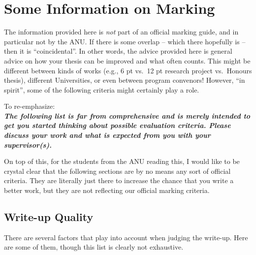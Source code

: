 \chapter{Some Information on Marking}\label{chap:Marking}

The information provided here is \emph{not} part of an official marking guide, and in particular not by the ANU. If there is some overlap -- which there hopefully is -- then it is ``coincidental''. In other words, the advice provided here is general advice on how your thesis can be improved and what often counts. This might be different between kinds of works (e.g., 6 pt vs.\ 12 pt research project vs.\ Honours thesis), different Universities, or even between program convenors! However, ``in spirit'', some of the following criteria might certainly play a role.

To re-emphasize:\\[.5em]
\emph{\textbf{The following list is far from comprehensive and is merely intended to get you started thinking about possible evaluation criteria. Please discuss your work and what is expected from you with your supervisor(s).}}

On top of this, for the students from the ANU reading this, I would like to be crystal clear that the following sections are by no means any sort of official criteria. They are literally just there to increase the chance that you write a better work, but they are not reflecting our official marking criteria.

\section{Write-up Quality}

There are several factors that play into account when judging the write-up. Here are some of them, though this list is clearly not exhaustive.

